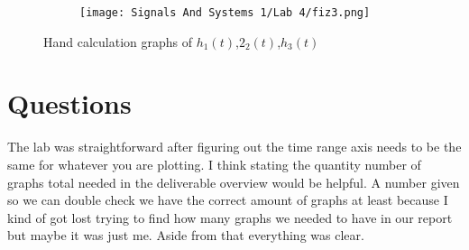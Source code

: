 \documentclass[12pt,a4paper]{article}
\begin{document}
\newpage

\begin{figure}[h]
\centering
\begin{subfigure}{ 1\textwidth}
\texttt{[image: Signals And Systems 1/Lab 4/fiz3.png]}
\end{subfigure}
\caption{ Hand calculation graphs of $h_1(t)$,$2_2(t)$,$h_3(t)$}
\label{fig2:image22}
\end{figure}

\section{Questions}\label{sec:res}

The lab was straightforward after figuring out the time range axis needs to be the same for whatever you are plotting. I think stating the quantity number of graphs total needed in the deliverable overview would be helpful. A number given so we can double check we have the correct amount of graphs at least because I kind of got lost trying to find how many graphs we needed to have in our report but maybe it was just me. Aside from that everything was clear.














\end{document}
